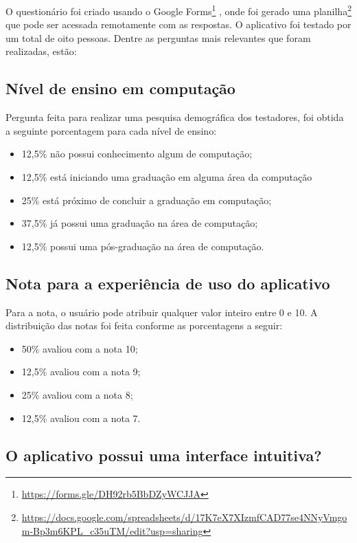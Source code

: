 O questionário foi criado usando o Google Forms\footnote{\url{https://forms.gle/DH92rb5BbDZyWCJJA}} \cite{forms}, onde foi gerado uma planilha\footnote{\url{https://docs.google.com/spreadsheets/d/17K7eX7XIzmfCAD77se4NNyVmgom-Bp3m6KPL_c35uTM/edit?usp=sharing}} que pode ser acessada remotamente com as respostas. O aplicativo foi testado por um total de oito pessoas. Dentre as perguntas mais relevantes que foram realizadas, estão:

\subsection{Nível de ensino em computação}

Pergunta feita para realizar uma pesquisa demográfica dos testadores, foi obtida a seguinte porcentagem para cada nível de ensino:

\begin{itemize}
    \item 12,5\% não possui conhecimento algum de computação;
    \item 12,5\% está iniciando uma graduação em alguma área da computação
    \item 25\% está próximo de concluir a graduação em computação;
    \item 37,5\% já possui uma graduação na área de computação;
    \item 12,5\% possui uma pós-graduação na área de computação.
\end{itemize}

\subsection{Nota para a experiência de uso do aplicativo}

Para a nota, o usuário pode atribuir qualquer valor inteiro entre 0 e 10. A distribuição das notas foi feita conforme as porcentagens a seguir:

\begin{itemize}
    \item 50\% avaliou com a nota 10;
    \item 12,5\% avaliou com a nota 9;
    \item 25\% avaliou com a nota 8;
    \item 12,5\% avaliou com a nota 7.
\end{itemize}

\subsection{O aplicativo possui uma interface intuitiva?}

